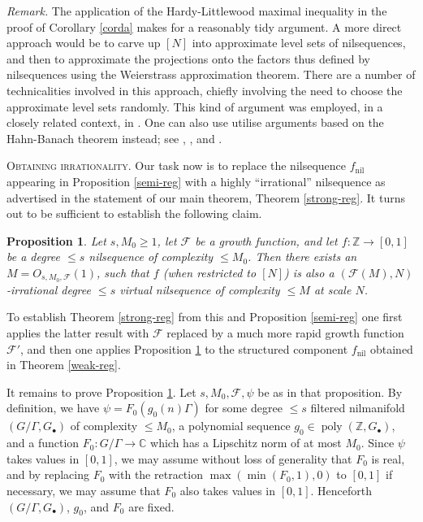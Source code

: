 \documentclass[11pt,reqno]{amsart}
\numberwithin{equation}{section}
\theoremstyle{plain}
\newtheorem{proposition}[subsection]{Proposition}
\theoremstyle{definition}
\renewcommand{\leq}{\leqslant}
\renewcommand{\geq}{\geqslant}
\newcommand\Z{\mathbb{Z}}
\newcommand\C{\mathbb{C}}
\newcommand\1{{\bf 1}}
\newcommand\2{{\bf 2}}
\newcommand\poly{\operatorname{poly}}
\newcommand\nil{{\operatorname{nil}}}
\newcommand\Grow{{\mathcal F}}
\begin{document}
\emph{Remark.} The application of the Hardy-Littlewood maximal inequality in the proof of Corollary \ref{corda} makes for a reasonably tidy argument. A more direct approach would be to carve up $[N]$ into approximate level sets of nilsequences, and then to approximate the projections onto the factors thus defined by nilsequences using the Weierstrass approximation theorem. There are a number of technicalities involved in this approach, chiefly involving the need to choose the approximate level sets randomly. This kind of argument was employed, in a closely related context, in \cite[Chapter 7]{green-tao-longprimeaps}.  One can also use utilise arguments based on the Hahn-Banach theorem instead; see \cite{gowers-regularity}, \cite{rttv}, and \cite{gowers-wolf-1,gowers-wolf-2,gowers-wolf-3}.\vspace{11pt}

\textsc{Obtaining irrationality.} Our task now is to replace the nilsequence $f_{\nil}$ appearing in Proposition \ref{semi-reg} with a highly ``irrational'' nilsequence as advertised in the statement of our main theorem, Theorem \ref{strong-reg}. It turns out to be sufficient to establish the following claim.

\begin{proposition}\label{totalis}  Let $s, M_0 \geq 1$, let $\Grow$ be a growth function, and let $f: \Z \to [0,1]$ be a degree $\leq s$ nilsequence of complexity $\leq M_0$.  Then there exists an $M = O_{s,M_0, \Grow}(1)$, such that $f$ \textup{(}when restricted to $[N]$\textup{)} is also a $(\Grow(M),N)$-irrational degree $\leq s$ virtual nilsequence of complexity $\leq M$ at scale $N$.\end{proposition}

To establish Theorem \ref{strong-reg} from this and Proposition \ref{semi-reg} one first applies the latter result with $\Grow$ replaced by a much more rapid growth function $\Grow'$, and then one applies Proposition \ref{totalis} to the structured component $f_\nil$ obtained in Theorem \ref{weak-reg}.  

It remains to prove Proposition \ref{totalis}.  Let $s, M_0,\Grow,\psi$ be as in that proposition.  By definition, we have $\psi = F_0( g_0(n) \Gamma )$ for some degree $\leq s$ filtered nilmanifold $(G/\Gamma,G_\bullet)$ of complexity $\leq M_0$, a polynomial sequence $g_0 \in \poly(\Z,G_\bullet)$, and a function $F_0: G/\Gamma \to \C$ which has a Lipschitz norm of at most $M_0$.   Since $\psi$ takes values in $[0,1]$, we may assume without loss of generality that $F_0$ is real, and by replacing $F_0$ with the retraction $\max(\min(F_0,1),0)$ to $[0,1]$ if necessary, we may assume that $F_0$ also takes values in $[0,1]$.  Henceforth $(G/\Gamma,G_\bullet)$, $g_0$, and $F_0$ are fixed.\vspace{11pt}
\end{document}
